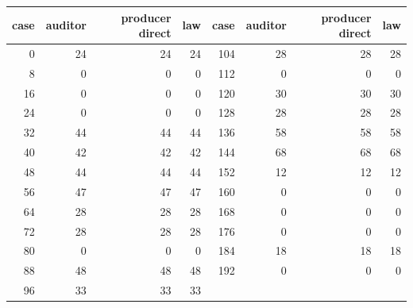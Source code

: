 \begin{tabular}{rrrr@{\qquad}rrrr}
\toprule
case & auditor & producer direct & law & case & auditor & producer direct & law\\
\midrule
0 & 24 & 24 & 24 & 104 & 28 & 28 & 28 \\
8 & 0 & 0 & 0 & 112 & 0 & 0 & 0 \\
16 & 0 & 0 & 0 & 120 & 30 & 30 & 30 \\
24 & 0 & 0 & 0 & 128 & 28 & 28 & 28 \\
32 & 44 & 44 & 44 & 136 & 58 & 58 & 58 \\
40 & 42 & 42 & 42 & 144 & 68 & 68 & 68 \\
48 & 44 & 44 & 44 & 152 & 12 & 12 & 12 \\
56 & 47 & 47 & 47 & 160 & 0 & 0 & 0 \\
64 & 28 & 28 & 28 & 168 & 0 & 0 & 0 \\
72 & 28 & 28 & 28 & 176 & 0 & 0 & 0 \\
80 & 0 & 0 & 0 & 184 & 18 & 18 & 18 \\
88 & 48 & 48 & 48 & 192 & 0 & 0 & 0 \\
96 & 33 & 33 & 33 &  &  &  &  \\
\bottomrule
\end{tabular}
